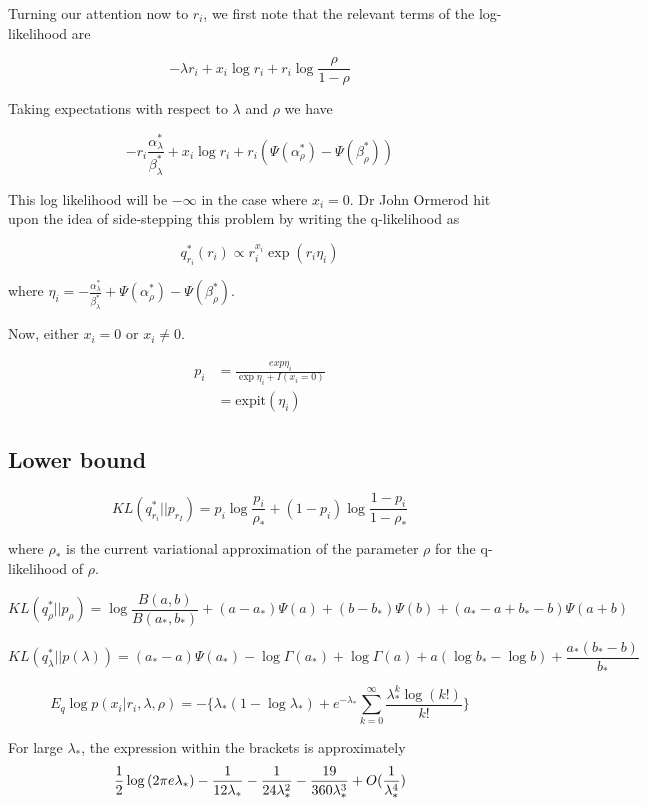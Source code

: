 \documentclass{amsart}
\begin{document}
Turning our attention now to $r_i$, we first note that the relevant terms of the
log-likelihood are

$$
-\lambda r_i + x_i \log{r_i} + r_i \log{\frac{\rho}{1 - \rho}}
$$

Taking expectations with respect to $\lambda$ and $\rho$ we have

$$
-r_i \frac{\alpha_\lambda^*}{\beta_\lambda^*} + x_i \log{r_i} + r_i (\Psi(\alpha_\rho^*) - \Psi(\beta_\rho^*))
$$

This log likelihood will be $-\infty$ in the case where $x_i = 0$. Dr John Ormerod hit
upon the idea of side-stepping this problem by writing the q-likelihood as

$$
q_{r_i}^*(r_i) \propto r_i^{x_i} \exp{(r_i \eta_i)}
$$

where $\eta_i = - \frac{\alpha_\lambda^*}{\beta_\lambda^*} + \Psi(\alpha_\rho^*) - \Psi(\beta_\rho^*)$.

Now, either $x_i = 0$ or $x_i \ne 0$.

\begin{align*}
p_i &= \frac{exp{\eta_i}}{\exp{\eta_i} + I(x_i = 0)} \\
&= \text{expit}(\eta_i)
\end{align*}

\subsection{Lower bound}
$$
KL(q_{r_i}^* || p_{r_I}) = p_i \log{\frac{p_i}{\rho_*}} + (1 - p_i) \log{\frac{1 - p_i}{1 - \rho_*}}
$$

where $\rho_*$ is the current variational approximation of the parameter $\rho$ for the q-likelihood of
$\rho$.

$$
KL(q_{\rho}^* || p_{\rho}) = \log{\frac{B(a, b)}{B(a_*, b_*)}} + (a - a_*) \Psi(a) + (b - b_*) \Psi(b) + (a_* - a + b_* - b) \Psi(a + b)
$$

$$
KL(q_{\lambda}^* || p(\lambda)) = (a_* - a) \Psi(a_*) - \log{\Gamma(a_*)} + \log{\Gamma(a)} + a(\log{b_*} - \log{b}) + \frac{a_*(b_* - b)}{b_*} 
$$

$$
E_q \log{p(x_i | r_i, \lambda, \rho)} = - \{ \lambda_* (1 - \log{\lambda_*}) + e^{-\lambda_*} \sum_{k=0}^\infty \frac{\lambda_*^k \log{(k!)}}{k!} \}
$$

For large $\lambda_*$, the expression within the brackets is approximately
$$
\frac{1}{2} \log{(2 \pi e \lambda_*)} - \frac{1}{12 \lambda_*} - \frac{1}{24 \lambda_*^2} - \frac{19}{360 \lambda_*^3} + O(\frac{1}{\lambda_*^4})
$$
\end{document}
